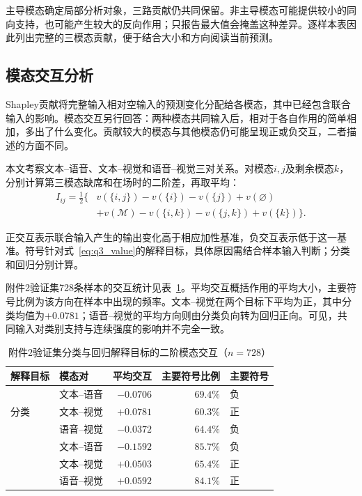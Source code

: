 \documentclass[UTF8,a4paper,12pt]{ctexart}
\newcommand{\QThreeParagraph}{\par\noindent\hspace*{2em}}
\begin{document}
\QThreeParagraph 主导模态确定局部分析对象，三路贡献仍共同保留。非主导模态可能提供较小的同向支持，也可能产生较大的反向作用；只报告最大值会掩盖这种差异。逐样本表因此列出完整的三模态贡献，便于结合大小和方向阅读当前预测。

\subsection{模态交互分析}\label{subsec:q3_interaction}
Shapley贡献将完整输入相对空输入的预测变化分配给各模态，其中已经包含联合输入的影响。模态交互另行回答：两种模态共同输入后，相对于各自作用的简单相加，多出了什么变化。贡献较大的模态与其他模态仍可能呈现正或负交互，二者描述的方面不同。

\QThreeParagraph 本文考察文本--语音、文本--视觉和语音--视觉三对关系。对模态$i,j$及剩余模态$k$，分别计算第三模态缺席和在场时的二阶差，再取平均：
\begin{equation}
\begin{aligned}
I_{ij}=\tfrac12\{&
v(\{i,j\})-v(\{i\})-v(\{j\})+v(\varnothing)\\
&+v(\mathcal M)-v(\{i,k\})-v(\{j,k\})+v(\{k\})\}.
\end{aligned}
\label{eq:q3_interaction}
\end{equation}
\QThreeParagraph 正交互表示联合输入产生的输出变化高于相应加性基准，负交互表示低于这一基准。符号针对式~\eqref{eq:q3_value}的解释目标，具体原因需结合样本输入判断；分类和回归分别计算。

\QThreeParagraph 附件2验证集728条样本的交互统计见表~\ref{tab:q3_interaction}。平均交互概括作用的平均大小，主要符号比例为该方向在样本中出现的频率。文本--视觉在两个目标下平均为正，其中分类均值为$+0.0781$；语音--视觉的平均方向则由分类负向转为回归正向。可见，共同输入对类别支持与连续强度的影响并不完全一致。

\begin{table}[H]
\centering\small
\caption{附件2验证集分类与回归解释目标的二阶模态交互（$n=728$）}
\label{tab:q3_interaction}
\begin{tabular}{@{}llrrl@{}}
\toprule
\QThreeParagraph 解释目标 & 模态对 & 平均交互 & 主要符号比例 & 主要符号\\
\midrule
\multirow{3}{*}{分类} & 文本--语音 & $-0.0706$ & $69.4\%$ & 负\\
 & 文本--视觉 & $+0.0781$ & $60.3\%$ & 正\\
 & 语音--视觉 & $-0.0372$ & $64.4\%$ & 负\\
\addlinespace
\multirow{3}{*}{回归} & 文本--语音 & $-0.1592$ & $85.7\%$ & 负\\
 & 文本--视觉 & $+0.0503$ & $65.4\%$ & 正\\
 & 语音--视觉 & $+0.0592$ & $84.1\%$ & 正\\
\bottomrule
\end{tabular}
\end{table}
\end{document}
